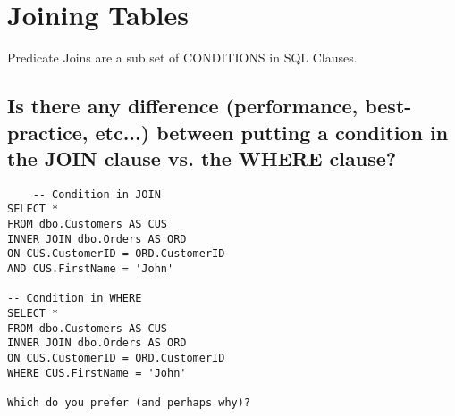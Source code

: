 \section{Joining Tables}

Predicate Joins are a sub set of CONDITIONS in SQL Clauses.

\subsection{Is there any difference (performance, best-practice, etc...) between putting a condition in the JOIN clause vs. the WHERE clause?}

\begin{verbatim}
    -- Condition in JOIN
SELECT *
FROM dbo.Customers AS CUS
INNER JOIN dbo.Orders AS ORD 
ON CUS.CustomerID = ORD.CustomerID
AND CUS.FirstName = 'John'

-- Condition in WHERE
SELECT *
FROM dbo.Customers AS CUS
INNER JOIN dbo.Orders AS ORD 
ON CUS.CustomerID = ORD.CustomerID
WHERE CUS.FirstName = 'John'

Which do you prefer (and perhaps why)?

\end{verbatim}